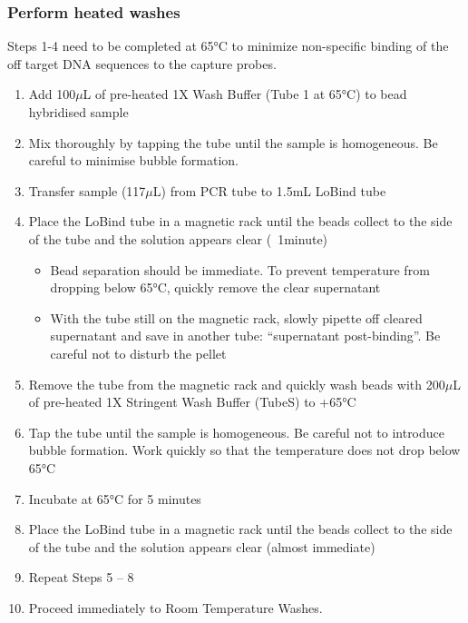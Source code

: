 \subsubsection{Perform heated washes} 
Steps 1-4 need to be completed at 65°C to minimize non-specific binding of the off target DNA sequences to the capture probes. 
\begin{enumerate}
	\item Add 100$\mu$L of pre-heated 1X Wash Buffer (Tube 1 at 65°C) to bead hybridised sample 
	\item Mix thoroughly by tapping the tube until the sample is homogeneous. Be careful to minimise bubble formation. 
	\item Transfer sample (117$\mu$L) from PCR tube to 1.5mL LoBind tube
	\item Place the LoBind tube in a magnetic rack until the beads collect to the side of the tube and the solution appears clear (~1minute)
	\begin{itemize}
		\item Bead separation should be immediate. To prevent temperature from dropping below 65°C, quickly remove the clear supernatant
		\item With the tube still on the magnetic rack, slowly pipette off cleared supernatant and save in another tube: “supernatant post-binding”. Be careful not to disturb the pellet
	\end{itemize} 
	\item Remove the tube from the magnetic rack and quickly wash beads with 200$\mu$L of pre-heated 1X Stringent Wash Buffer (TubeS) to +65°C
	\item Tap the tube until the sample is homogeneous. Be careful not to introduce bubble formation. Work quickly so that the temperature does not drop below 65°C
	\item Incubate at 65°C for 5 minutes
	\item Place the LoBind tube in a magnetic rack until the beads collect to the side of the tube and the solution appears clear (almost immediate) 
	\item Repeat Steps 5 – 8 
	\item Proceed immediately to Room Temperature Washes.
\end{enumerate} 

